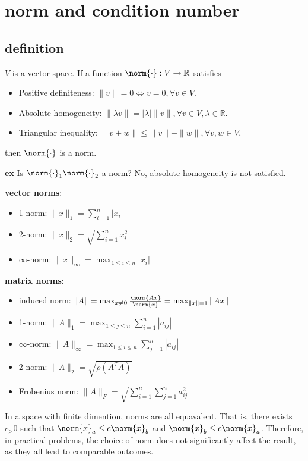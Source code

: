 \documentclass{article}%
\begin{document}
\section{norm and condition number}
\subsection{definition}
$V$ is a vector space. If a function $\norm{\cdot}:V \to \mathbb{R}$ satisfies
\begin{itemize}
    \item Positive definiteness: $\|v\|=0 \Longleftrightarrow v=0, \forall v \in V$.
    \item Absolute homogeneity: $\|\lambda v\|=|\lambda|\|v\|, \forall v \in V, \lambda \in \mathbb{R}$.
    \item  Triangular inequality: $\|v+w\| \leq\|v\|+\|w\|, \forall v, w \in V$, 
\end{itemize}
then $\norm{\cdot}$ is a norm.

\textbf{ex} Is $\norm{\cdot}_1\norm{\cdot}_2$ a norm? No, absolute homogeneity is not satisfied.

\textbf{vector norms}:
\begin{itemize}
    \item 1-norm: $\|x\|_1=\sum_{i=1}^n|x_i|$
    \item 2-norm: $\|x\|_2=\sqrt{\sum_{i=1}^n x_i^2}$
    \item $\infty$-norm: $\|x\|_{\infty}=\max_{1\leq i\leq n}|x_i|$
\end{itemize}

\textbf{matrix norms}:
\begin{itemize}
    \item induced norm: $\|A\|=\max_{x\neq 0}\frac{\norm{Ax}}{\norm{x}} =\max_{\|x\|=1}\|Ax\|$
    \item 1-norm: $\|A\|_1=\max_{1\leq j\leq n}\sum_{i=1}^n|a_{ij}|$
    \item $\infty$-norm: $\|A\|_{\infty}=\max_{1\leq i\leq n}\sum_{j=1}^n|a_{ij}|$
    \item 2-norm: $\|A\|_2=\sqrt{\rho(A^TA)}$
    \item Frobenius norm: $\|A\|_F=\sqrt{\sum_{i=1}^n\sum_{j=1}^n a_{ij}^2}$
\end{itemize}

In a space with finite dimention, norms are all equavalent. That is, there exists $c_>0$ such that $\norm{x}_a\leq c\norm{x}_b$ and $\norm{x}_b\leq c \norm{x}_a$. Therefore, in practical problems, the choice of norm does not significantly affect the result, as they all lead to comparable outcomes.
\end{document}
